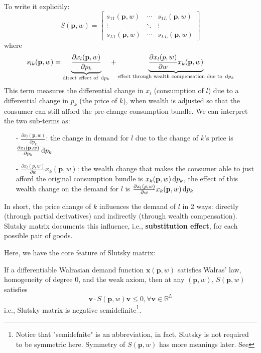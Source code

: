 To write it explicitly:
$$
S(\mathbf{p},w)=
\begin{bmatrix}
    s_{11}(\mathbf{p},w) & \cdots & s_{1L}(\mathbf{p},w)\\
    \vdots & \ddots & \vdots \\
    s_{L1}(\mathbf{p},w) & \cdots & s_{LL}(\mathbf{p},w)
\end{bmatrix}
$$
where $$s_{lk}(\mathbf{p},w)=\underbrace{\frac{\partial x_l(\mathbf{p},w)}{\partial p_k}}_{\text{direct effect of }\mathop{}\!\mathrm{d} p_k} +\underbrace{\frac{\partial x_l (p,w)}{\partial w}x_k(\mathbf{p},w)}_{\text{effect through wealth compensation due to }\mathop{}\!\mathrm{d} p_k}$$
This term measures the differential change in $x_l$ (consumption of $l$) due to a differential change in $p_k$ (the price of $k$), when wealth is adjusted so that the consumer can still afford the pre-change consumption bundle. We can interpret the two sub-terms as:
\begin{enumerate}
    \item[-] $\frac{\partial x_l(\mathbf{p},w)}{\partial p_k}$: the change in demand for $l$ due to the change of $k$'s price is $\frac{\partial x_l(\mathbf{p},w)}{\partial p_k}\mathop{}\!\mathrm{d} p_k$
    \item[-] $\frac{\partial x_l (p,w)}{\partial w}x_k(\mathbf{p},w)$: the wealth change that makes the consumer able to just afford the original consumption bundle is $x_k(\mathbf{p},w)\mathop{}\!\mathrm{d} p_k$, the effect of this wealth change on the demand for $l$ is $\frac{\partial x_l (p,w)}{\partial w}x_k(\mathbf{p},w)\mathop{}\!\mathrm{d} p_k$
\end{enumerate}
In short, the price change of $k$ influences the demand of $l$ in 2 ways: directly (through partial derivatives) and indirectly (through wealth compensation). Slutsky matrix documents this influence, i.e., \textbf{substitution effect}, for each possible pair of goods. 

Here, we have the core feature of Slutsky matrix: 
\begin{theorem}
    If a differentiable Walrasian demand function $\mathbf{x}(\mathbf{p},w)$ satisfies Walras' law, homogeneity of degree 0, and the weak axiom, then at any $(\mathbf{p},w)$, $S(\mathbf{p},w)$ satisfies
    $$\mathbf{v}\cdot S(\mathbf{p},w)\mathbf{v}\leq 0, \forall \mathbf{v}\in\mathbb{R}^L$$
    i.e., Slutsky matrix is negative semidefinite\footnote{Notice that "semidefnite" is an abbreviation, in fact, Slutsky is not required to be symmetric here. Symmetry of $S(\mathbf{p},w)$ has more meanings later. See }.
\end{theorem}

